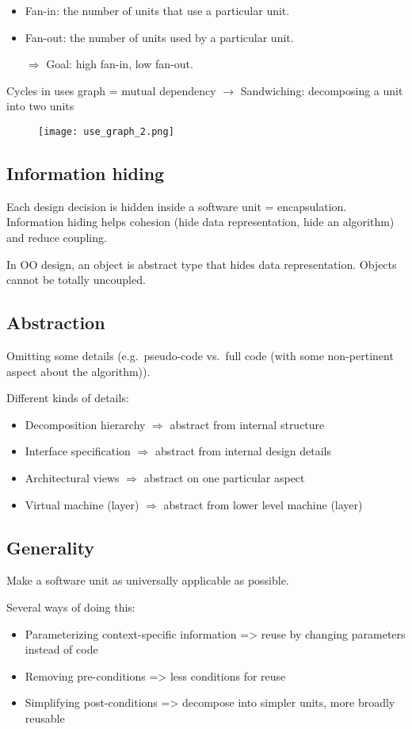 \begin{itemize}
\item Fan-in: the number of units that use a particular unit. 
\item Fan-out: the number of units used by a particular unit. 
\item[$\Rightarrow$] Goal: high fan-in, low fan-out.
\end{itemize}

Cycles in uses graph = mutual dependency $\rightarrow$ Sandwiching: decomposing a unit into two units

\begin{figure}[!ht]
    \centering
    \texttt{[image: use\_graph\_2.png]}
\end{figure}

\subsection{Information hiding}

Each design decision is hidden inside a software unit = encapsulation.
Information hiding helps cohesion (hide data representation, hide an algorithm)
and reduce coupling. \newline

In OO design, an object is abstract type that hides data representation.
Objects cannot be totally uncoupled.

\subsection{Abstraction}

Omitting some details (e.g.\ pseudo-code vs.\ full code (with some non-pertinent aspect about the algorithm)). 

Different kinds of details:
\begin{itemize}
\item Decomposition hierarchy $\Rightarrow$ abstract from internal structure
\item Interface specification $\Rightarrow$ abstract from internal design details
\item Architectural views $\Rightarrow$ abstract on one particular aspect
\item Virtual machine (layer) $\Rightarrow$ abstract from lower level machine (layer)
\end{itemize}

\subsection{Generality}

Make a software unit as universally applicable as possible. 

Several ways of doing this:

\begin{itemize}
\item Parameterizing context-specific information => reuse by changing parameters
instead of code
\item Removing pre-conditions => less conditions for reuse
\item Simplifying post-conditions => decompose into simpler units, more broadly reusable
\end{itemize}
